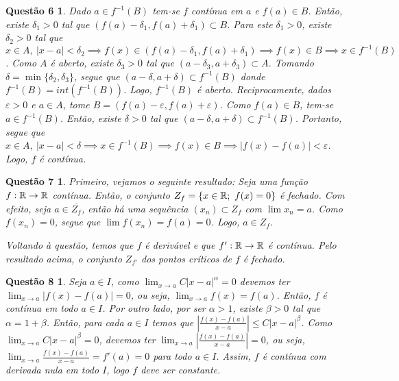 \documentclass[a4paper,12pt]{article}
\newtheorem*{6}{Questão 6}
\newtheorem*{7}{Questão 7}
\newtheorem*{8}{Questão 8}
\begin{document}
\begin{6}
	
	Dado $a \in f^{-1}(B)$ tem-se $f$ contínua em $a$ e $f(a) \in B$. Então, existe $\delta_1 > 0$ tal que $(f(a)-\delta_1, f(a)+\delta_1) \subset B$. Para este $\delta_1 > 0$, existe $\delta_2 > 0$ tal que $x \in A, \ |x-a| < \delta_2 \implies f(x) \in (f(a)-\delta_1, f(a)+\delta_1) \implies f(x) \in B \implies x \in f^{-1}(B)$. Como $A$ é aberto, existe $\delta_3 > 0$ tal que $(a-\delta_3, a+\delta_3) \subset A$. Tomando $\delta = \min\{\delta_2, \delta_3\}$, segue que $(a-\delta, a+\delta) \subset f^{-1}(B)$ donde $f^{-1}(B) = int(f^{-1}(B))$. Logo, $f^{-1}(B)$ é aberto. Reciprocamente, dados $\varepsilon > 0$ e $a \in A$, tome $B = (f(a)-\varepsilon, f(a)+\varepsilon)$. Como $f(a) \in B$, tem-se $a \in f^{-1}(B)$. Então, existe $\delta > 0$ tal que $(a-\delta, a+\delta) \subset f^{-1}(B)$. Portanto, segue que $x \in A, \ |x-a| < \delta \implies x \in f^{-1}(B) \implies f(x) \in B \implies |f(x)-f(a)| < \varepsilon$. Logo, $f$ é contínua.
	
\end{6}

\begin{7}
	
	Primeiro, vejamos o seguinte resultado: Seja uma função $f:\Bbb R \to \Bbb R$ contínua. Então, o conjunto $Z_f = \{x \in \Bbb R; \ f(x) = 0\}$ é fechado. Com efeito, seja $a \in \overline{Z_f}$, então há uma sequência $(x_n) \subset Z_f$ com $\lim x_n = a$. Como $f(x_n) = 0$, segue que $\lim f(x_n) = f(a) = 0$. Logo, $a \in Z_f$.
	
	Voltando à questão, temos que $f$ é derivável e que $f': \Bbb R \to \Bbb R$ é contínua. Pelo resultado acima, o conjunto $Z_{f'}$ dos pontos críticos de $f$ é fechado.
	
\end{7}

\begin{8}
	
	Seja $a \in I$, como $\lim_{x\to a}C|x-a|^{\alpha} = 0$ devemos ter $\lim_{x\to a}|f(x) - f(a)| = 0$, ou seja, $\lim_{x\to a}f(x) = f(a)$. Então, $f$ é contínua em todo $a \in I$. Por outro lado, por ser $\alpha > 1$, existe $\beta > 0$ tal que $\alpha = 1 + \beta$. Então, para cada $a \in I$ temos que $|\frac{f(x) - f(a)}{x-a}| \leq C|x-a|^{\beta}$. Como $\lim_{x\to a}C|x-a|^{\beta} = 0$, devemos ter $\lim_{x\to a}|\frac{f(x) - f(a)}{x-a}| = 0$, ou seja, $\lim_{x\to a}\frac{f(x) - f(a)}{x-a}= f'(a) = 0$ para todo $a \in I$. Assim, $f$ é contínua com derivada nula em todo $I$, logo $f$ deve ser constante.
	
\end{8}
\end{document}
